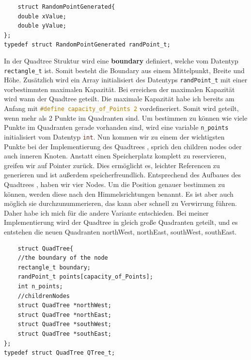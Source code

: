 \documentclass[11pt]{article}
\newcommand{\qt}{Quadtree }
\newcommand{\qts}{Quadtrees }
\newcommand{\nw}{northWest}
\newcommand{\noea}{northEast}
\newcommand{\sw}{southWest}
\newcommand{\se}{southEast}
\newcommand{\fett}[1]{{\bf #1}}
\newcommand{\lstin}[1]{\lstinline[language=C]{#1}}
\begin{document}
\begin{lstlisting}
    struct RandomPointGenerated{
    double xValue; 
    double yValue; 
};
typedef struct RandomPointGenerated randPoint_t;
\end{lstlisting}
In der Quadtree Struktur wird eine \fett{boundary} definiert, welche vom Datentyp \lstin{rectangle_t} ist. Somit besteht die Boundary aus einem Mittelpunkt, Breite und Höhe. Zusätzlich wird ein Array initialisiert des Datentyps \lstin{randPoint_t} mit einer vorbestimmten maximalen Kapazität. Bei erreichen der maximalen Kapazität wird wann der Quadtree geteilt. 
Die maximale Kapazität habe ich bereits am Anfang mit \lstin{#define capacity_of_Points 2} vordefineriert. Somit wird geteilt, wenn mehr als 2 Punkte im Quadranten sind. Um bestimmen zu können wie viele Punkte im Quadranten gerade vorhanden sind, wird eine variable \lstin{n_points} initialisiert vom Datentyp \lstin{int}.
Nun kommen wir zu einem der wichtigsten Punkte bei der Implementierung des \qts, sprich den children nodes oder auch inneren Knoten. \newline
Anstatt einen Speicherplatz komplett zu reservieren, greifen wir auf Pointer zurück. Dies ermöglicht es, leichter Referencen zu generieren und ist außerdem speicherfreundlich. Entsprechend des Aufbaues des \qts , haben wir vier Nodes. Um die Position genauer bestimmen zu können, werden diese nach den Himmelsrichtungen benannt. Es ist aber auch möglich sie durchzunummerieren, das kann aber schnell zu Verwirrung führen. 
Daher habe ich mich für die andere Variante entschieden.\newline
Bei meiner Implementierung wird der \qt in gleich große Quadranten geteilt, und es entstehen die neuen Quadranten \nw , \noea , \sw , \se. 

\begin{lstlisting}  
    struct QuadTree{
    //the boundary of the node
    rectangle_t boundary;                                     
    randPoint_t points[capacity_of_Points];                  
    int n_points;                                            
    //childrenNodes
    struct QuadTree *northWest;                             
    struct QuadTree *northEast; 
    struct QuadTree *southWest; 
    struct QuadTree *southEast; 
};
typedef struct QuadTree QTree_t; 
\end{lstlisting}
\end{document}
